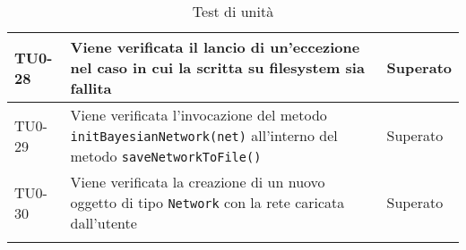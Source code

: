 \begin{longtable}{|C{.15\textwidth}|m{.65\textwidth}|C{.20\textwidth}|}
\hline 
{} TU0-28 & Viene verificata il lancio di un'eccezione nel caso in cui la scritta su filesystem sia fallita & Superato \\ 
\hline 
TU0-29 & Viene verificata l'invocazione del metodo \texttt{initBayesianNetwork(net)} all'interno del metodo \texttt{saveNetworkToFile()} & Superato \\ 
 TU0-30 & Viene verificata la creazione di un nuovo oggetto di tipo \texttt{Network} con la rete caricata dall'utente & Superato \\ 
\hline












\caption{Test di unità}
\label{testunita}
\end{longtable}
